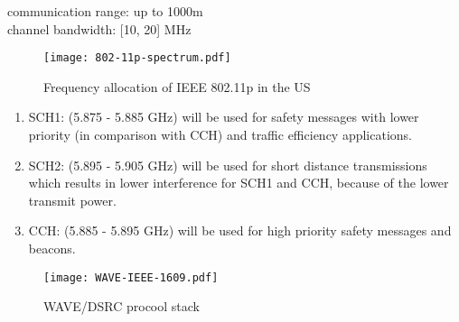 communication range: up to 1000m \\
channel bandwidth: [10, 20] MHz

\begin{figure}[H]
    \centering
    \texttt{[image: 802-11p-spectrum.pdf]}
    \caption{Frequency allocation of IEEE 802.11p in the US}
    \label{fig:802-11p-spectrum}
\end{figure}

\begin{enumerate}
    \item SCH1: (5.875 - 5.885 GHz) will be used for safety messages with lower priority (in comparison with CCH) and traffic efficiency applications.
    \item SCH2: (5.895 - 5.905 GHz) will be used for short distance transmissions which results in lower interference for SCH1 and CCH, because of the lower transmit power.
    \item CCH: (5.885 - 5.895 GHz) will be used for high priority safety messages and beacons.
\end{enumerate}






    



\begin{figure}[H]
    \centering
    \texttt{[image: WAVE-IEEE-1609.pdf]}
    \caption{WAVE/DSRC procool stack}
    \label{fig:iso-ieee-wave}
\end{figure}


